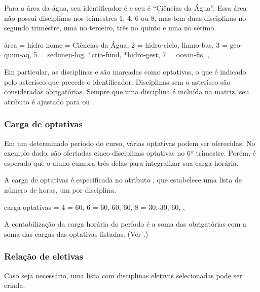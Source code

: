 \documentclass[a4paper, 11pt]{article}
\begin{document}
Para a área da água, seu identificador é  e seu  é ``Ciências da Água''. Essa área não possui disciplinas nos trimestres 1, 4, 6 ou 8, mas tem duas disciplinas no segundo trimestre, uma no terceiro, três no quinto e uma no sétimo.

\begin{PDListing}
    área = {hidro}{
        nome = {Ciências da Água},
        2 = {hidro-ciclo, limno-bas},
        3 = {geo-quim-aq},
        5 = {sedimen-log, *crio-fund, *hidro-gest},
        7 = {ocean-fis},
    },
\end{PDListing}

Em particular, as disciplinas  e  são marcadas como optativas, o que é indicado pelo asterisco que precede o identificador. Disciplinas sem o asterisco são consideradas obrigatórias. Sempre que uma disciplina é incluída na matriz, seu atributo  é ajustado para  ou .

\subsubsection*{Carga de optativas}
Em um determinado período do curso, várias optativas podem ser oferecidas. No exemplo dado, são ofertadas cinco disciplinas optativas no 6º trimestre. Porém, é esperado que o aluno cumpra três delas para integralizar sua carga horária.

A carga de optativas é especificada no atributo , que estabelece uma lista de número de horas, um por disciplina.

\begin{PDListing}
    carga optativas = {
        4 = {60},
        6 = {60, 60, 60},
        8 = {30, 30, 60},
    },
\end{PDListing}

A contabilização da carga horária do período é a soma das obrigatórias com a soma das cargas das optativas listadas. (Ver .)

\subsubsection*{Relação de eletivas}

Caso seja necessário, uma lista com disciplinas eletivas selecionadas pode ser criada.
\end{document}
